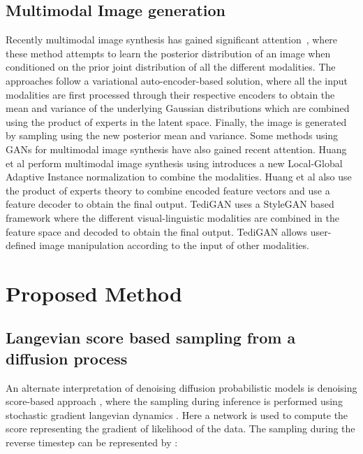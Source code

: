 \documentclass[10pt,twocolumn,letterpaper]{article}
\begin{document}
\subsection{Multimodal Image generation}
Recently multimodal image synthesis has gained significant attention~\cite{huang2021multimodal,shi2019variational,sutter2021generalized,suzuki2016joint,wu2018multimodal,xia2021tedigan,zhang2021m6}, where these method attempts to learn the posterior distribution of an image when conditioned on the prior joint distribution of all the different modalities. The approaches \cite{shi2019variational,suzuki2016joint,wu2018multimodal,zhang2021m6,sutter2021generalized} follow a variational auto-encoder-based solution, where all the input modalities are first processed through their respective encoders to obtain the mean and variance of the underlying Gaussian distributions which are combined using the product of experts in the latent space. Finally, the image is generated by sampling using the new posterior mean and variance. Some methods using GANs for multimodal image synthesis have also gained recent attention. Huang et al\cite{huang2021multimodal} perform multimodal image synthesis using introduces a new Local-Global Adaptive Instance normalization to combine the modalities. Huang et al \cite{huang2021multimodal} also use the product of experts theory to combine encoded feature vectors and use a feature decoder to obtain the final output. TediGAN\cite{xia2021tedigan} uses a StyleGAN \cite{karras2019style} based framework where the different visual-linguistic modalities are combined in the feature space and decoded to obtain the final output. TediGAN allows user-defined image manipulation according to the input of other modalities.



















\section{Proposed Method}

\subsection{Langevian score based sampling from a diffusion process}
\label{sec:score}
An alternate interpretation of denoising diffusion probabilistic models is denoising score-based approach \cite{song2019generative}, where the sampling during inference is performed using stochastic gradient langevian dynamics \cite{welling2011bayesian}. Here a network is used to compute the score representing the gradient of likelihood of the data. The sampling during the reverse timestep  can be represented by \cite{song2019generative}:
\end{document}
